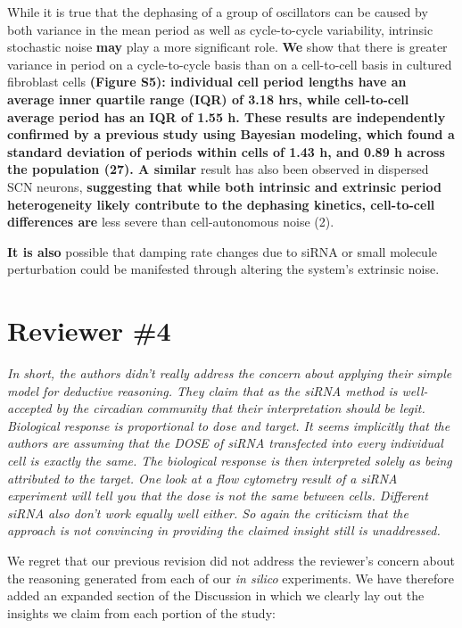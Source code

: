 \documentclass[11pt, letterpaper]{article}
\newenvironment{reviewer}{\itshape\color{gray}}{}
\newenvironment{manuscript}[1]{\begin{center}\begin{tcolorbox}[colback=green!5!white,colframe=green!75!black,width=\textwidth,title={#1},breakable,fonttitle=\bfseries]}{\end{tcolorbox}\end{center}}
\begin{document}
\begin{manuscript}{Page 6}
  While it is true that the dephasing of a group of oscillators can be caused by both variance in the mean period as well as cycle-to-cycle variability, intrinsic stochastic noise {\bf may} play a more significant role. 
{\bf We} show that there is greater variance in period on a cycle-to-cycle basis than on a cell-to-cell basis in cultured fibroblast cells {\bf (Figure S5): individual cell period lengths have an average inner quartile range (IQR) of 3.18 hrs, while cell-to-cell average period has an IQR of 1.55 h. 
These results are independently confirmed by a previous study using Bayesian modeling, which found a standard deviation of periods within cells of 1.43 h, and 0.89 h across the population (27). 
A similar} result has also been observed in dispersed SCN neurons, {\bfseries suggesting that while both intrinsic and extrinsic period heterogeneity likely contribute to the dephasing kinetics, cell-to-cell differences are} less severe than cell-autonomous noise (2).

{\bf It is also} possible that damping rate changes due to siRNA or small molecule perturbation could be manifested through altering the system's extrinsic noise.
\end{manuscript}

\section*{Reviewer \#4}

\begin{reviewer}
In short, the authors didn't really address the concern about applying their simple model for deductive reasoning. 
They claim that as the siRNA method is well-accepted by the circadian community that their interpretation should be legit. 
Biological response is proportional to dose and target. 
It seems implicitly that the authors are assuming that the DOSE of siRNA transfected into every individual cell is exactly the same. 
The biological response is then interpreted solely as being attributed to the target. 
One look at a flow cytometry result of a siRNA experiment will tell you that the dose is not the same between cells. 
Different siRNA also don't work equally well either. 
So again the criticism that the approach is not convincing in providing the claimed insight still is unaddressed.
\end{reviewer}

We regret that our previous revision did not address the reviewer's concern about the reasoning generated from each of our {\itshape in silico} experiments.
We have therefore added an expanded section of the Discussion in which we clearly lay out the insights we claim from each portion of the study:
\end{document}
